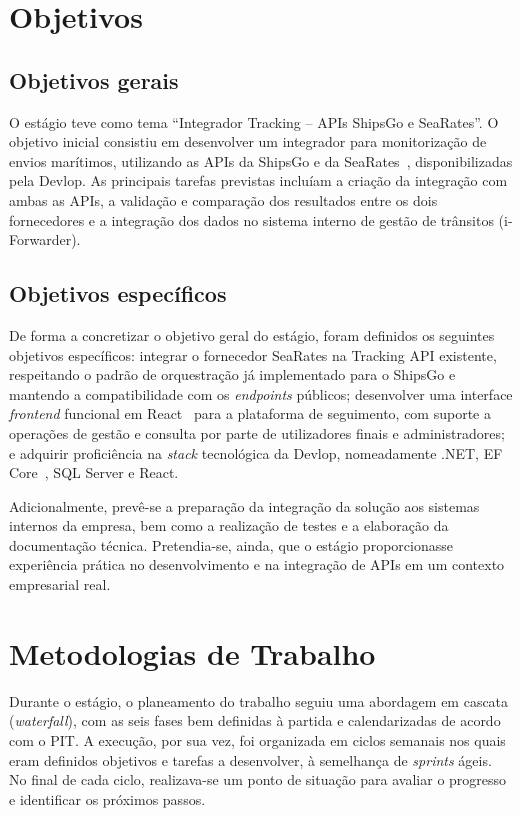 \documentclass[a4paper,12pt]{report}
\begin{document}
\section{Objetivos}

\subsection{Objetivos gerais}

O estágio teve como tema \enquote{Integrador Tracking -- APIs ShipsGo e SeaRates}. O objetivo inicial consistiu em desenvolver um integrador para monitorização de envios marítimos, utilizando as APIs da ShipsGo e da SeaRates~\cite{searates}, disponibilizadas pela Devlop. As principais tarefas previstas incluíam a criação da integração com ambas as APIs, a validação e comparação dos resultados entre os dois fornecedores e a integração dos dados no sistema interno de gestão de trânsitos (i-Forwarder).

\subsection{Objetivos específicos}

De forma a concretizar o objetivo geral do estágio, foram definidos os seguintes objetivos específicos: integrar o fornecedor SeaRates na Tracking API existente, respeitando o padrão de orquestração já implementado para o ShipsGo e mantendo a compatibilidade com os \textit{endpoints} públicos; desenvolver uma interface \textit{frontend} funcional em React~\cite{react} para a plataforma de seguimento, com suporte a operações de gestão e consulta por parte de utilizadores finais e administradores; e adquirir proficiência na \textit{stack} tecnológica da Devlop, nomeadamente .NET, EF Core~\cite{efcore}, SQL Server e React.

Adicionalmente, prevê-se a preparação da integração da solução aos sistemas internos da empresa, bem como a realização de testes e a elaboração da documentação técnica. Pretendia-se, ainda, que o estágio proporcionasse experiência prática no desenvolvimento e na integração de APIs em um contexto empresarial real.

\section{Metodologias de Trabalho}

Durante o estágio, o planeamento do trabalho seguiu uma abordagem em cascata (\textit{waterfall}), com as seis fases bem definidas à partida e calendarizadas de acordo com o PIT. A execução, por sua vez, foi organizada em ciclos semanais nos quais eram definidos objetivos e tarefas a desenvolver, à semelhança de \textit{sprints} ágeis. No final de cada ciclo, realizava-se um ponto de situação para avaliar o progresso e identificar os próximos passos.
\end{document}
